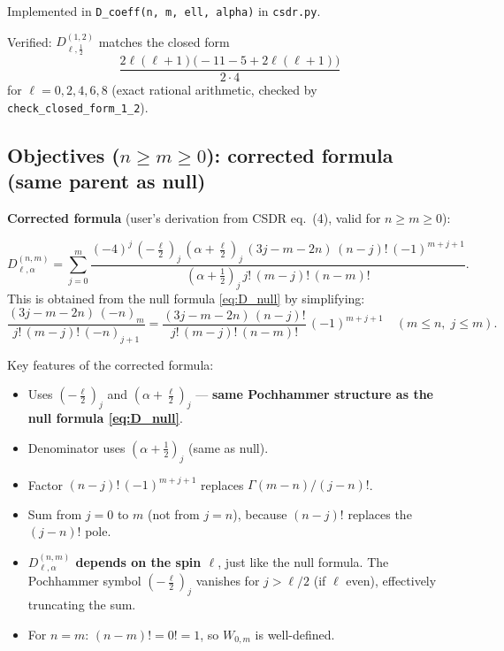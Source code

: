 \documentclass{article}
\begin{document}
Implemented in \texttt{D\_coeff(n, m, ell, alpha)} in \texttt{csdr.py}.

\begin{mdframed}[backgroundcolor=yellow!20]
Verified: $D^{(1,2)}_{\ell,\tfrac{1}{2}}$ matches the closed form
\[
  \frac{2\ell(\ell+1)\bigl(-11-5+2\ell(\ell+1)\bigr)}{2\cdot4}
\]
for $\ell = 0, 2, 4, 6, 8$ (exact rational arithmetic, checked by \texttt{check\_closed\_form\_1\_2}).
\end{mdframed}

\subsection{Objectives ($n \ge m \ge 0$): corrected formula (same parent as null)}

\textbf{Corrected formula} (user's derivation from CSDR eq.~(4), valid for $n \ge m \ge 0$):

\begin{equation}\label{eq:D_obj}
  D_{\ell,\alpha}^{(n,m)}
  = \sum_{j=0}^{m}
    \frac{(-4)^j\,(-\tfrac{\ell}{2})_j\,(\alpha+\tfrac{\ell}{2})_j\,(3j-m-2n)\,(n-j)!\,(-1)^{m+j+1}}
         {(\alpha+\tfrac{1}{2})_j\,j!\,(m-j)!\,(n-m)!}.
\end{equation}
This is obtained from the null formula \eqref{eq:D_null} by simplifying:
\[
  \frac{(3j-m-2n)\,(-n)_m}{j!\,(m-j)!\,(-n)_{j+1}}
  = \frac{(3j-m-2n)\,(n-j)!}{j!\,(m-j)!\,(n-m)!}\,(-1)^{m+j+1}
  \quad (m\le n, \; j\le m).
\]

Key features of the corrected formula:
\begin{itemize}
  \item Uses $(-\tfrac{\ell}{2})_j$ and $(\alpha+\tfrac{\ell}{2})_j$ — \textbf{same Pochhammer
        structure as the null formula \eqref{eq:D_null}}.
  \item Denominator uses $(\alpha+\tfrac{1}{2})_j$ (same as null).
  \item Factor $(n-j)!\,(-1)^{m+j+1}$ replaces $\Gamma(m-n)/(j-n)!$.
  \item Sum from $j=0$ to $m$ (not from $j=n$), because $(n-j)!$ replaces the $(j-n)!$ pole.
  \item \textbf{$D_{\ell,\alpha}^{(n,m)}$ depends on the spin $\ell$}, just like the null formula.
        The Pochhammer symbol $(-\tfrac{\ell}{2})_j$ vanishes for $j>\ell/2$ (if $\ell$ even),
        effectively truncating the sum.
  \item For $n=m$: $(n-m)! = 0! = 1$, so $W_{0,m}$ is well-defined.
\end{itemize}
\end{document}
